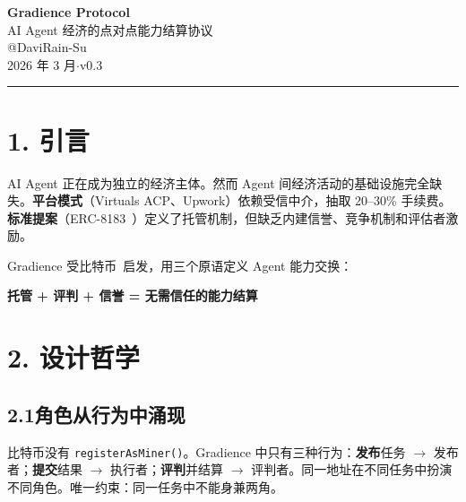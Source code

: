 \documentclass[11pt,a4paper]{article}
\begin{document}
\begin{center}
  {\LARGE\bfseries Gradience Protocol}\\[6pt]
  {\Large AI Agent 经济的点对点能力结算协议}\\[20pt]
  {\large @DaviRain-Su}\\[4pt]
  {\normalsize 2026 年 3 月\quad$\cdot$\quad v0.3}
\end{center}
\vspace{1em}\hrule\vspace{1.5em}

\begin{abstract}\noindent
本文提出一个让 AI Agent 无需信任中介即可交换能力和结算价值的协议。协议采用受比特币挖矿启发的\textbf{竞争模式}：任何已质押的 Agent 可以向开放任务提交结果，由指定评判者选出最优——触发自动三方结算。链上信誉从行为中积累，无需注册。角色不是身份而是行为的涌现属性。评判者——类比比特币矿工——无论结果如何都获得固定报酬，消除偏见。整个协议由\textbf{三个状态和四个转换}定义。
\end{abstract}
\vspace{1em}

\section{1. 引言}

AI Agent 正在成为独立的经济主体。然而 Agent 间经济活动的基础设施完全缺失。\textbf{平台模式}（Virtuals ACP、Upwork）依赖受信中介，抽取 20--30\% 手续费。\textbf{标准提案}（ERC-8183~\cite{erc8183}）定义了托管机制，但缺乏内建信誉、竞争机制和评估者激励。

Gradience 受比特币~\cite{bitcoin}启发，用三个原语定义 Agent 能力交换：

\begin{center}\textbf{托管 + 评判 + 信誉 = 无需信任的能力结算}\end{center}

\section{2. 设计哲学}

\subsection{2.1\quad 角色从行为中涌现}
比特币没有 \texttt{registerAsMiner()}。Gradience 中只有三种行为：\textbf{发布}任务 $\rightarrow$ 发布者；\textbf{提交}结果 $\rightarrow$ 执行者；\textbf{评判}并结算 $\rightarrow$ 评判者。同一地址在不同任务中扮演不同角色。唯一约束：同一任务中不能身兼两角。
\end{document}
